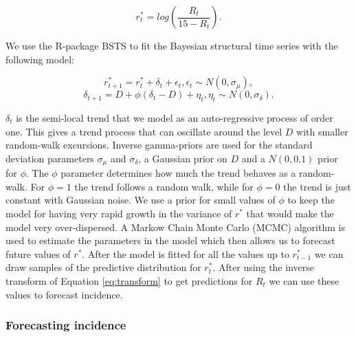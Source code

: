 \documentclass[12pt]{article}
\begin{document}
\begin{equation}
r^*_t = log\left(\frac{R_t}{15 - R_t}\right).
\label{eq:transform}
\end{equation}

We use the R-package BSTS \cite{scottBstsBayesianStructural2019} to fit the Bayesian structural time series with the following model:

\[r^*_{t+1} = r^*_t + \delta_t + \epsilon_t, \epsilon_t \sim N(0, \sigma_\mu),\]
\[\delta_{t+1} = D + \phi(\delta_t - D) + \eta_t, \eta_t \sim N(0, \sigma_\delta).\]

$\delta_t$ is the semi-local trend that we model as an auto-regressive process of order one. This gives a trend process that can oscillate around the level $D$ with smaller random-walk excursions. Inverse gamma-priors are used for the standard deviation parameters $\sigma_\mu$ and $\sigma_\delta$, a Gaussian prior on $D$ and a $N(0, 0.1)$ prior for $\phi$. The $\phi$ parameter determines how much the trend behaves as a random-walk. For $\phi=1$ the trend follows a random walk, while for $\phi=0$ the trend is just constant with Gaussian noise. We use a prior for small values of $\phi$ to keep the model for having very rapid growth in the variance of $r^*$ that would make the model very over-dispersed. A Markow Chain Monte Carlo (MCMC) algorithm is used to estimate the parameters in the model which then allows us to forecast future values of $r^*$. After the model is fitted for all the values up to  $r^*_{t-1}$ we can draw samples of the predictive distribution for $r^*_t$. After using the inverse transform of Equation \ref{eq:transform} to get predictions for $R_t$ we can use these values to forecast incidence. 


\subsubsection{Forecasting incidence}
\end{document}
